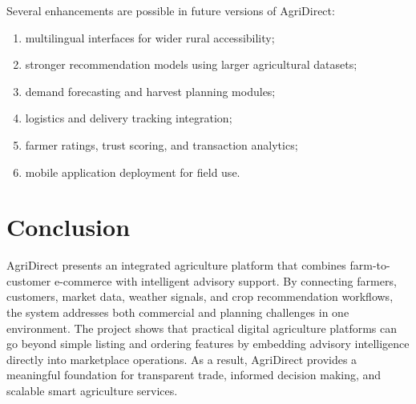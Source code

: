 \documentclass[conference]{IEEEtran}
\begin{document}
Several enhancements are possible in future versions of AgriDirect:

\begin{enumerate}
\item multilingual interfaces for wider rural accessibility;
\item stronger recommendation models using larger agricultural datasets;
\item demand forecasting and harvest planning modules;
\item logistics and delivery tracking integration;
\item farmer ratings, trust scoring, and transaction analytics;
\item mobile application deployment for field use.
\end{enumerate}

\section{Conclusion}
AgriDirect presents an integrated agriculture platform that combines farm-to-customer e-commerce with intelligent advisory support. By connecting farmers, customers, market data, weather signals, and crop recommendation workflows, the system addresses both commercial and planning challenges in one environment. The project shows that practical digital agriculture platforms can go beyond simple listing and ordering features by embedding advisory intelligence directly into marketplace operations. As a result, AgriDirect provides a meaningful foundation for transparent trade, informed decision making, and scalable smart agriculture services.
\end{document}
